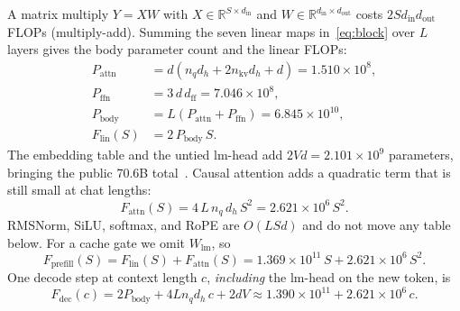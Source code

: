 A matrix multiply $Y=XW$ with $X\in\mathbb{R}^{S\times d_{\mathrm{in}}}$ and $W\in\mathbb{R}^{d_{\mathrm{in}}\times d_{\mathrm{out}}}$ costs $2Sd_{\mathrm{in}}d_{\mathrm{out}}$ FLOPs (multiply-add). Summing the seven linear maps in~\eqref{eq:block} over $L$ layers gives the body parameter count and the linear FLOPs:
\begin{align}
P_{\mathrm{attn}}
  &= d(n_q d_h + 2 n_{\mathrm{kv}} d_h + d)
  = 1.510\times 10^8,
  \nonumber\\
P_{\mathrm{ffn}}
  &= 3\,d\,d_{\mathrm{ff}}
  = 7.046\times 10^8,
  \nonumber\\
P_{\mathrm{body}}
  &= L(P_{\mathrm{attn}}+P_{\mathrm{ffn}})
  = 6.845\times 10^{10},
  \nonumber\\
F_{\mathrm{lin}}(S)
  &= 2\,P_{\mathrm{body}}\,S.
  \label{eq:flin}
\end{align}
The embedding table and the untied lm-head add $2Vd=2.101\times 10^9$ parameters, bringing the public 70.6B total~\citep{grattafiori2024llama}. Causal attention adds a quadratic term that is still small at chat lengths:
\begin{equation}
\label{eq:fattn}
F_{\mathrm{attn}}(S)
  = 4\,L\,n_q\,d_h\,S^2
  = 2.621\times 10^6\,S^2.
\end{equation}
RMSNorm, SiLU, softmax, and RoPE are $O(LSd)$ and do not move any table below. For a cache gate we omit $W_{\mathrm{lm}}$, so
\begin{equation}
\label{eq:fprefill}
F_{\mathrm{prefill}}(S)
  = F_{\mathrm{lin}}(S)+F_{\mathrm{attn}}(S)
  = 1.369\times 10^{11}\,S + 2.621\times 10^6\,S^2.
\end{equation}
One decode step at context length $c$, \emph{including} the lm-head on the new token, is
\begin{equation}
\label{eq:fdec}
F_{\mathrm{dec}}(c)
  = 2P_{\mathrm{body}} + 4Ln_q d_h\,c + 2dV
  \approx 1.390\times 10^{11} + 2.621\times 10^6\,c.
\end{equation}

